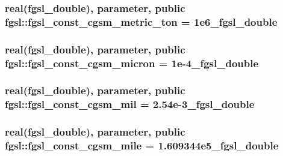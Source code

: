 \subsubsection[{fgsl\+\_\+const\+\_\+cgsm\+\_\+metric\+\_\+ton}]{\setlength{\rightskip}{0pt plus 5cm}real({\bf fgsl\+\_\+double}), parameter, public fgsl\+::fgsl\+\_\+const\+\_\+cgsm\+\_\+metric\+\_\+ton = 1e6\+\_\+fgsl\+\_\+double}\label{namespacefgsl_a6d4725a1ee32c2bf1dcd4aa1d2e00908}
\hypertarget{namespacefgsl_afa1f606b298574904dc1963ed870db4b}{}
\subsubsection[{fgsl\+\_\+const\+\_\+cgsm\+\_\+micron}]{\setlength{\rightskip}{0pt plus 5cm}real({\bf fgsl\+\_\+double}), parameter, public fgsl\+::fgsl\+\_\+const\+\_\+cgsm\+\_\+micron = 1e-\/4\+\_\+fgsl\+\_\+double}\label{namespacefgsl_afa1f606b298574904dc1963ed870db4b}
\hypertarget{namespacefgsl_afa02507efeb6d20012bb31b69efa6291}{}
\subsubsection[{fgsl\+\_\+const\+\_\+cgsm\+\_\+mil}]{\setlength{\rightskip}{0pt plus 5cm}real({\bf fgsl\+\_\+double}), parameter, public fgsl\+::fgsl\+\_\+const\+\_\+cgsm\+\_\+mil = 2.\+54e-\/3\+\_\+fgsl\+\_\+double}\label{namespacefgsl_afa02507efeb6d20012bb31b69efa6291}
\hypertarget{namespacefgsl_a56582420eb5e22fb229cf4eea9cb3fca}{}
\subsubsection[{fgsl\+\_\+const\+\_\+cgsm\+\_\+mile}]{\setlength{\rightskip}{0pt plus 5cm}real({\bf fgsl\+\_\+double}), parameter, public fgsl\+::fgsl\+\_\+const\+\_\+cgsm\+\_\+mile = 1.\+609344e5\+\_\+fgsl\+\_\+double}\label{namespacefgsl_a56582420eb5e22fb229cf4eea9cb3fca}
\hypertarget{namespacefgsl_a021d66524bb3e4b9305ce5399f11f2ec}{}
